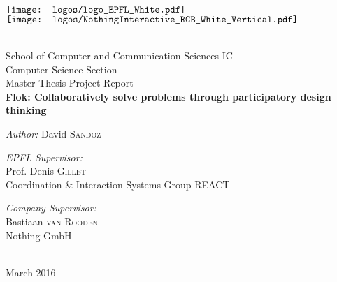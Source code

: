\pagecolor{rocketorange}
\color{white}

\begin{titlepage}

\begin{center}

\begin{minipage}{6in}
  \centering
  $\vcenter{\hbox{\texttt{[image: logos/logo\_EPFL\_White.pdf]}}}$
  \hspace*{2cm}
  $\vcenter{\hbox{\texttt{[image: logos/NothingInteractive\_RGB\_White\_Vertical.pdf]}}}$
\end{minipage}\\[2 cm]

{\large School of Computer and Communication Sciences IC}\\[0.5cm]
{\large Computer Science Section}\\[0.5cm]
{\Large Master Thesis Project Report}\\[0.5cm]


\vspace{1cm}
{\huge \bfseries Flok: Collaboratively solve problems through participatory design thinking}\\[0.4cm]

\vspace{1.5cm}

\large \emph{Author:} David \textsc{Sandoz}\\[1.5cm]

\begin{minipage}{0.5\textwidth}
\begin{flushleft} \large
\emph{EPFL Supervisor:}\\
Prof. Denis \textsc{Gillet}\\
Coordination \& Interaction Systems Group REACT
\end{flushleft}
\end{minipage}
\begin{minipage}{0.4\textwidth}
\begin{flushright} \large
\emph{Company Supervisor:}\\
Bastiaan \textsc{van Rooden}\\
Nothing GmbH\\
~
\end{flushright}
\end{minipage}

\vfill

{\large March 2016}

\end{center}

\end{titlepage}

\pagecolor{white}
\color{black}
